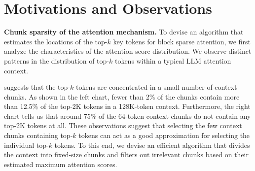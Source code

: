 \section{Motivations and Observations}
\label{motivation}

\textbf{Chunk sparsity of the attention mechanism.}
To devise an algorithm that estimates the locations of the top-$k$ key tokens for block sparse attention, we first analyze the characteristics of the attention score distribution.
We observe distinct patterns in the distribution of top-$k$ tokens within a typical LLM attention context.


 suggests that the top-$k$ tokens are concentrated in a small number of context chunks. As shown in the left chart, fewer than 2\% of the chunks contain more than 12.5\% of the top-2K tokens in a 128K-token context. Furthermore, the right chart tells us that around 75\% of the 64-token context chunks do not contain any top-2K tokens at all.
These observations suggest that selecting the few context chunks containing top-$k$ tokens can act as a good approximation for selecting the individual top-$k$ tokens. 
To this end, we devise an efficient algorithm that divides the context into fixed-size chunks and filters out irrelevant chunks based on their estimated maximum attention scores.
